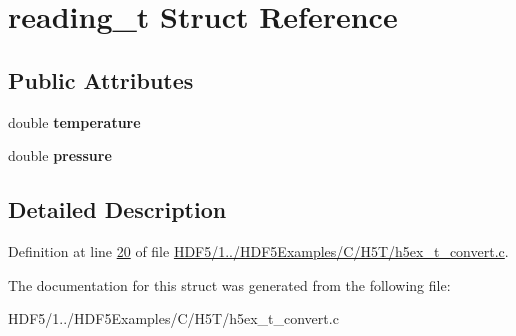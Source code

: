 \hypertarget{structreading__t}{}\section{reading\+\_\+t Struct Reference}
\label{structreading__t}
\subsection*{Public Attributes}
\begin{DoxyCompactItemize}
\item 
\mbox{\label{structreading__t_a43cc5abf88b7efda3766fdb4b54be77e}} 
double {\bfseries temperature}
\item 
\mbox{\label{structreading__t_ade34f3213aead5ba84282d212a88371c}} 
double {\bfseries pressure}
\end{DoxyCompactItemize}


\subsection{Detailed Description}


Definition at line \hyperlink{_h_d_f5_21_810_81_2_h_d_f5_examples_2_c_2_h5_t_2h5ex__t__convert_8c_source_l00020}{20} of file \hyperlink{_h_d_f5_21_810_81_2_h_d_f5_examples_2_c_2_h5_t_2h5ex__t__convert_8c_source}{H\+D\+F5/1../\+H\+D\+F5\+Examples/\+C/\+H5\+T/h5ex\+\_\+t\+\_\+convert.\+c}.



The documentation for this struct was generated from the following file\+:\begin{DoxyCompactItemize}
\item 
H\+D\+F5/1../\+H\+D\+F5\+Examples/\+C/\+H5\+T/h5ex\+\_\+t\+\_\+convert.\+c\end{DoxyCompactItemize}
